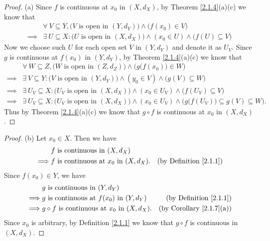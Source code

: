 \begin{proof}{(a)}
    Since \(f\) is continuous at \(x_0\) in \((X, d_X)\), by Theorem \ref{2.1.4}(a)(c) we know that
    \begin{align*}
                 & \forall\ V \subseteq Y, \big(V \text{ is open in } (Y, d_Y)\big) \land \big(f(x_0) \in V\big)                        \\
        \implies & \exists\ U \subseteq X : \big(U \text{ is open in } (X, d_X)\big) \land (x_0 \in U) \land \big(f(U) \subseteq V\big)
    \end{align*}
    Now we choose such \(U\) for each open set \(V\) in \((Y, d_Y)\) and denote it as \(U_V\).
    Since \(g\) is continuous at \(f(x_0)\) in \((Y, d_Y)\), by Theorem \ref{2.1.4}(a)(c) we know that
    \begin{align*}
                 & \forall\ W \subseteq Z, \big(W \text{ is open in } (Z, d_Z)\big) \land \Big(g\big(f(x_0)\big) \in W\Big)                                                \\
        \implies & \exists\ V \subseteq Y : \big(V \text{ is open in } (Y, d_Y)\big) \land (y_0 \in V) \land \big(g(V) \subseteq W\big)                                    \\
        \implies & \exists\ U_V \subseteq X : \big(U_V \text{ is open in } (X, d_X)\big) \land (x_0 \in U_V) \land \big(f(U_V) \subseteq V\big)                            \\
        \implies & \exists\ U_V \subseteq X : \big(U_V \text{ is open in } (X, d_X)\big) \land (x_0 \in U_V) \land \Big(g\big(f(U_V)\big) \subseteq g(V) \subseteq W\Big).
    \end{align*}
    Thus by Theorem \ref{2.1.4}(a)(c) we know that \(g \circ f\) is continuous at \(x_0\) in \((X, d_X)\).
\end{proof}

\begin{proof}{(b)}
    Let \(x_0 \in X\).
    Then we have
    \begin{align*}
                 & f \text{ is continuous in } (X, d_X)                                                       \\
        \implies & f \text{ is continuous at } x_0 \text{ in } (X, d_X). & \text{(by Definition \ref{2.1.1})}
    \end{align*}
    Since \(f(x_0) \in Y\), we have
    \begin{align*}
                 & g \text{ is continuous in } (Y, d_Y)                                                                 \\
        \implies & g \text{ is continuous at } f(x_0) \text{ in } (Y, d_Y)       & \text{(by Definition \ref{2.1.1})}   \\
        \implies & g \circ f \text{ is continuous at } x_0 \text{ in } (X, d_X). & \text{(by Corollary \ref{2.1.7}(a))}
    \end{align*}
    Since \(x_0\) is arbitrary, by Definition \ref{2.1.1} we know that \(g \circ f\) is continuous in \((X, d_X)\).
\end{proof}

